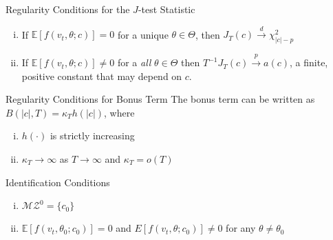 \begin{frame}

  \footnotesize

  \begin{block}{Regularity Conditions for the $J$-test Statistic}
	\begin{enumerate}[(i)]
    \item If $\mathbb{E}[f(v_t, \theta;c)] =0$ for a unique $\theta \in \Theta$, then $J_T(c) \overset{d}{\rightarrow} \chi^2_{|c| -p}$
    \item If $\mathbb{E}[f(v_t, \theta;c)] \neq 0$ for a \emph{all} $\theta \in \Theta$ then $T^{-1} J_T(c) \overset{p}{\rightarrow} a(c)$, a finite, positive constant that may depend on $c$.
	\end{enumerate}
\end{block}


  \begin{block}{Regularity Conditions for Bonus Term} The bonus term can be written as $B(|c|,T) = \kappa_T h(|c|)$, where
	\begin{enumerate}[(i)]
		\item $h(\cdot)$ is strictly increasing
		\item $\kappa_T \rightarrow \infty$ as $T\rightarrow \infty$ and $\kappa_T =o(T)$
	\end{enumerate}
\end{block}

  \begin{block}{Identification Conditions}
	\begin{enumerate}[(i)]
		\item $\mathcal{MZ}^0 = \{c_0\}$
    \item $\mathbb{E}[f(v_t, \theta_0; c_0)] = 0$ and $E[f(v_t, \theta; c_0)]\neq 0$ for any $\theta \neq \theta_0$
	\end{enumerate}
\end{block}



\end{frame}
